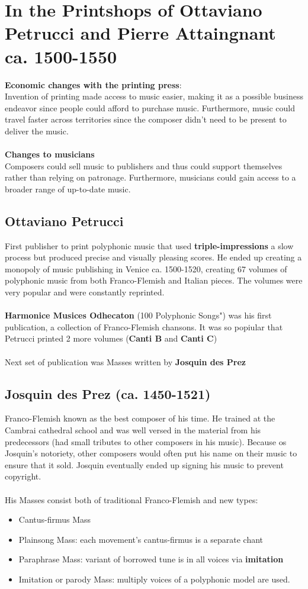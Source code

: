 \documentclass{article}
\begin{document}
  \section{In the Printshops of Ottaviano Petrucci and Pierre Attaingnant ca. 1500-1550}
  \textbf{Economic changes with the printing press}: \\
  Invention of printing made access to music easier, making it as a possible business endeavor since people could afford to purchase music. Furthermore, music could travel faster across territories since the composer didn't need to be present to deliver the music. \\ \\
  \textbf{Changes to musicians} \\
  Composers could sell music to publishers and thus could support themselves rather than relying on patronage. Furthermore, musicians could gain access to a broader range of up-to-date music.
  \subsection{Ottaviano Petrucci}
  First publisher to print polyphonic music that used \textbf{triple-impressions} a slow process but produced precise and visually pleasing scores. He ended up creating a monopoly of music publishing in Venice ca. 1500-1520, creating 67 volumes of polyphonic music from both Franco-Flemish and Italian pieces. The volumes were very popular and were constantly reprinted. \\ \\
  \textbf{Harmonice Musices Odhecaton} (100 Polyphonic Songs") was his first publication, a collection of Franco-Flemish chansons. It was so popiular that Petrucci printed 2 more volumes (\textbf{Canti B} and \textbf{Canti C}) \\ \\
  Next set of publication was Masses written by \textbf{Josquin des Prez}
  \subsection{Josquin des Prez (ca. 1450-1521)}
  Franco-Flemish known as the best composer of his time. He trained at the Cambrai cathedral school and was well versed in the material from his predecessors (had small tributes to other composers in his music). Because os Josquin's notoriety, other composers would often put his name on their music to ensure that it sold. Josquin eventually ended up signing his music to prevent copyright. \\ \\
  His Masses consist both of traditional Franco-Flemish and new types:
  \begin{itemize}
    \item Cantus-firmus Mass
    \item Plainsong Mass: each movement's cantus-firmus is a separate chant
    \item Paraphrase Mass: variant of borrowed tune is in all voices via \textbf{imitation}
    \item Imitation or parody Mass: multiply voices of a polyphonic model are used.
  \end{itemize}
\end{document}
